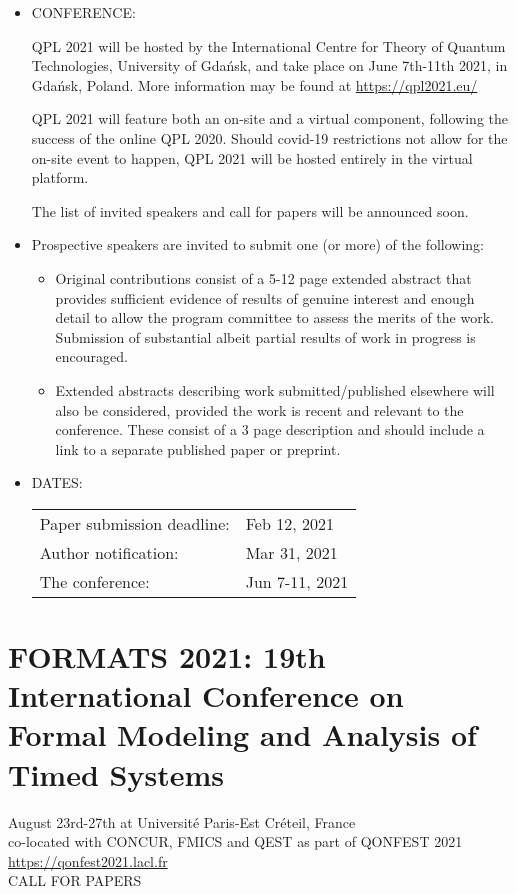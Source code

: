 \documentclass{article}
\begin{document}
\begin{itemize}\item  CONFERENCE:  
 
  QPL 2021 will be hosted by the International Centre for Theory of Quantum Technologies, University of Gdańsk, and take place on June 7th-11th 2021, in Gdańsk, Poland. More information may be found at \href{https://qpl2021.eu/}{https://qpl2021.eu/} 
 
  QPL 2021 will feature both an on-site and a virtual component, following the success of the online QPL 2020. Should covid-19 restrictions not allow for the on-site event to happen, QPL 2021 will be hosted entirely in the virtual platform. 
 
  The list of invited speakers and call for papers will be announced soon. 
 
\item  Prospective speakers are invited to submit one (or more) of the following:  
 
\begin{itemize}\item  Original contributions consist of a 5-12 page extended abstract that provides sufficient evidence of results of genuine interest and enough detail to allow the program committee to assess the merits of the work. Submission of substantial albeit partial results of work in progress is encouraged.
\item  Extended abstracts describing work submitted/published elsewhere will also be considered, provided the work is recent and relevant to the conference. These consist of a 3 page description and should include a link to a separate published paper or preprint. 
\end{itemize} 
\item  DATES: 
 
\begin{tabulary}{\linewidth}{LL}Paper submission deadline:  & Feb 12, 2021 \\
Author notification:  & Mar 31, 2021 \\
The conference:  & Jun 7-11, 2021 \\
\end{tabulary}
 
\end{itemize}\section{FORMATS 2021: 19th International Conference on Formal Modeling and Analysis of Timed Systems}\label{FORMATS2021}  August 23rd-27th at Université Paris-Est Créteil, France\\ 
  co-located with CONCUR, FMICS and QEST as part of QONFEST 2021\\ 
  \href{https://qonfest2021.lacl.fr}{https://qonfest2021.lacl.fr}\\ 
CALL FOR PAPERS 
\end{document}
